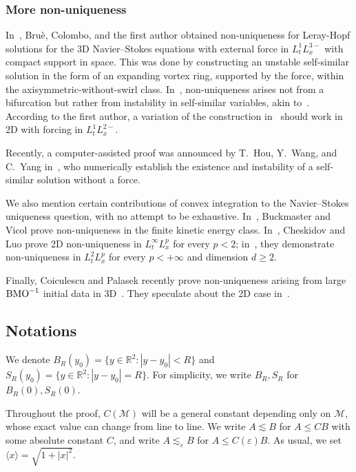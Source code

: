 \documentclass[12pt,reqno]{amsart}
\theoremstyle{plain}
\theoremstyle{definition}
\newcommand{\R}{\mathbb{R}}
\newcommand{\M}{\mathcal{M}}
\renewcommand{\:}{\colon}
\newcommand{\BMO}{{\rm BMO}}
\numberwithin{equation}{section}
\numberwithin{figure}{section}
\begin{document}
\subsubsection{More non-uniqueness} 

In~\cite{albritton2021non}, Bru{\`e}, Colombo, and the first author obtained non-uniqueness for Leray-Hopf solutions for the 3D Navier--Stokes equations with external force in $L^1_t L^{3-}_x$ with compact support in space. This was done by constructing an unstable self-similar solution in the form of an expanding vortex ring, supported by the force, within the axisymmetric-without-swirl class. In~\cite{albritton2021non}, non-uniqueness arises not from a bifurcation but rather from instability in self-similar variables, akin to~\cite[Proof of Theorem 4.1]{jiasverakillposed}. According to the first author, a variation of the construction in~\cite{albritton2021non} should work in 2D with forcing in $L^1_t L^{2-}_x$.

Recently, a computer-assisted proof was announced by T.~Hou, Y.~Wang, and C.~Yang in~\cite{hou2025nonuniqueness}, who numerically establish the existence and instability of a self-similar solution without a force.

We also mention certain contributions of convex integration to the Navier--Stokes uniqueness question, with no attempt to be exhaustive. In~\cite{BuckmasterVicolNavierStokesAnnals}, Buckmaster and Vicol prove non-uniqueness in the finite kinetic energy class. In~\cite{CheskidovLuoL2crit2023}, Cheskidov and Luo prove 2D non-uniqueness in $L^\infty_t L^p_x$ for every $p < 2$; in~\cite{CheskidovLuoSharp2022}, they demonstrate non-uniqueness in $L^2_t L^p_x$ for every $p < +\infty$ and dimension $d \geq 2$.

Finally, Coiculescu and Palasek recently prove non-uniqueness arising from large $\BMO^{-1}$ initial data in 3D~\cite{coiculescu2025non}. They speculate about the 2D case in~\cite[Remark 1.7]{coiculescu2025non}.


\subsection{Notations} We denote $B_R(y_0) = \{y \in \R^2 : |y-y_0|<R\}$ and $S_R(y_0) = \{y \in \R^2 : |y-y_0| = R\}$. For simplicity, we write $B_R, S_R$ for $B_R(0), S_R(0)$. 

Throughout the proof, $C(\M)$ will be a general constant depending only on $\M$, whose exact value can change from line to line. We write $A \lesssim B$ for $A \le C B$ with some absolute constant $C$, and write $A \lesssim_\varepsilon B$ for $A \le C(\varepsilon) B$. As usual, we set $\langle x \rangle = \sqrt{1+|x|^2}$.
\end{document}
